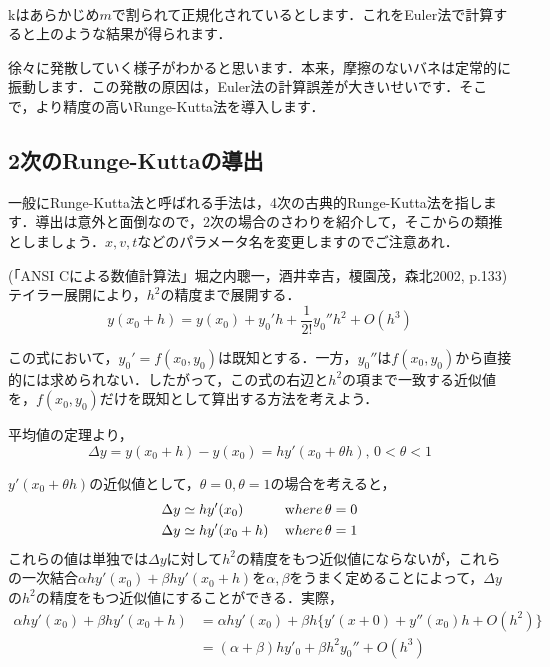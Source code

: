 \documentclass[11pt]{article}
\begin{document}
    \begin{center}
    \end{center}
    { \hspace*{\fill} \\}
    
    kはあらかじめ\(m\)で割られて正規化されているとします．これをEuler法で計算すると上のような結果が得られます．

徐々に発散していく様子がわかると思います．本来，摩擦のないバネは定常的に振動します．この発散の原因は，Euler法の計算誤差が大きいせいです．そこで，より精度の高いRunge-Kutta法を導入します．

    \subsection{2次のRunge-Kuttaの導出}\label{ux6b21ux306erunge-kuttaux306eux5c0eux51fa}

一般にRunge-Kutta法と呼ばれる手法は，4次の古典的Runge-Kutta法を指します．導出は意外と面倒なので，2次の場合のさわりを紹介して，そこからの類推としましょう．\(x,v,t\)などのパラメータ名を変更しますのでご注意あれ．

(「ANSI Cによる数値計算法」堀之内聰一，酒井幸吉，榎園茂，森北2002,
p.133) テイラー展開により，\(h^2\)の精度まで展開する． \[
y(x_0+h) = y(x_0) +y_0'h+\frac{1}{2!}y_0''h^2 + O(h^3)
\]

この式において，\(y_0' = f(x_0,y_0)\)は既知とする．一方，\(y_0''\)は\(f(x_0,y_0)\)から直接的には求められない．したがって，この式の右辺と\(h^2\)の項まで一致する近似値を，\(f(x_0,y_0)\)だけを既知として算出する方法を考えよう．

平均値の定理より， \[
\Delta y = y(x_0+h)-y(x_0) = hy'(x_0 + \theta h), \, 0<\theta<1
\]

\(y'(x_0 +\theta h)\)の近似値として，\(\theta=0, \theta=1\)の場合を考えると，
\[
\begin{aligned}
\Delta y &\simeq hy'(x_0) \, &{\textrm where}\, &\theta=0\\
\Delta y &\simeq hy'(x_0+h)  \, &{\textrm where}\, &\theta=1
\end{aligned}
\]
これらの値は単独では\(\Delta y\)に対して\(h^2\)の精度をもつ近似値にならないが，これらの一次結合\(\alpha h y'(x_0)+\beta hy'(x_0+h)\)を\(\alpha, \beta\)をうまく定めることによって，\(\Delta y\)の\(h^2\)の精度をもつ近似値にすることができる．実際，
\[
\begin{aligned}
\alpha h y'(x_0)+\beta hy'(x_0+h) & =\alpha h y'(x_0)+\beta h \{y'(x+0)+y''(x_0)h+O(h^2)\} \\
& =(\alpha+\beta)hy'_0 + \beta h^2 y_0'' + O(h^3)
\end{aligned}
\]
\end{document}
